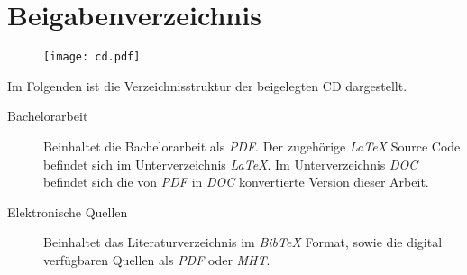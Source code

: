 \chapter*{Beigabenverzeichnis}

\begin{figure}[H] 
  \centering
     \texttt{[image: cd.pdf]}
\end{figure}


Im Folgenden ist die Verzeichnisstruktur der beigelegten CD dargestellt.
 
\begin{description}
  \item[Bachelorarbeit]
    Beinhaltet die Bachelorarbeit als \textit{PDF}.
    Der zugehörige \emph{\LaTeX{}} Source Code befindet sich im Unterverzeichnis \textit{LaTeX}.
    Im Unterverzeichnis \textit{DOC} befindet sich die von \textit{PDF} in \textit{DOC} konvertierte Version dieser Arbeit.
  \item[Elektronische Quellen]
    Beinhaltet das Literaturverzeichnis im \textit{BibTeX} Format, sowie die digital verfügbaren Quellen als \textit{PDF} oder \textit{MHT}.
\end{description}
